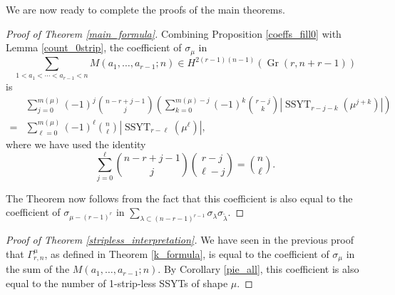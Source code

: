 \documentclass[11pt]{article}
\theoremstyle{definition}
\numberwithin{equation}{section}
\DeclareMathOperator{\Gr}{Gr}
\DeclareMathOperator{\ssyt}{SSYT}
\begin{document}
We are now ready to complete the proofs of the main theorems.

\begin{proof}[Proof of Theorem \ref{main_formula}]
Combining Proposition \ref{coeffs_fill0} with Lemma \ref{count_0strip}, the coefficient of $\sigma_\mu$ in 
\begin{equation*}
\sum_{1<a_1<\cdots<a_{r-1}<n}M(a_1,\ldots,a_{r-1};n)\in H^{2(r-1)(n-1)}(\Gr(r,n+r-1))
\end{equation*}
is 
\begin{align*}
&\sum_{j=0}^{m(\mu)}(-1)^j\binom{n-r+j-1}{j}\left(\sum_{k=0}^{m(\mu)-j}(-1)^k\binom{r-j}{k}|\ssyt_{r-j-k}(\mu^{j+k})|\right)\\
=&\sum_{\ell=0}^{m(\mu)}(-1)^{\ell}\binom{n}{\ell}|\ssyt_{r-\ell}(\mu^\ell)|,
\end{align*}
where we have used the identity
\begin{equation*}
\sum_{j=0}^{\ell}\binom{n-r+j-1}{j}\binom{r-j}{\ell-j}=\binom{n}{\ell}.
\end{equation*}

The Theorem now follows from the fact that this coefficient is also equal to the coefficient of $\sigma_{\mu-(r-1)^r}$ in $\sum_{\lambda\subset(n-r-1)^{r-1}}\sigma_{\lambda}\sigma_{\widetilde{\lambda}}$.
\end{proof}

\begin{proof}[Proof of Theorem \ref{stripless_interpretation}]
We have seen in the previous proof that $\Gamma^\mu_{r,n}$, as defined in Theorem \ref{k_formula}, is equal to the coefficient of $\sigma_\mu$ in the sum of the $M(a_1,\ldots,a_{r-1};n)$. By Corollary \ref{pie_all}, this coefficient is also equal to the number of 1-strip-less SSYTs of shape $\mu$.
\end{proof}
\end{document}
